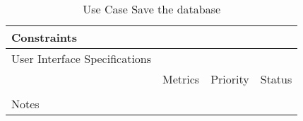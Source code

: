 \begin{table}[H]
\begin{tabularx}{\linewidth}{|l|X|X|X|}
    \hline Constraints                   & \multicolumn{3}{l|}{}                                                                                 \\

    \hline User Interface Specifications & \multicolumn{3}{l|}{}                                                                                 \\

    \hline \multirow{2}{*}{}             & Metrics                                                                           & Priority & Status \\
    \cline{2-4}                          &                                                                                   &          &        \\
    \hline Notes                         & \multicolumn{3}{l|}{}                                                                                 \\
    \hline
  \end{tabularx}
  \caption{Use Case Save the database}
  \label{tab:use_case_save_the_database}
\end{table}

